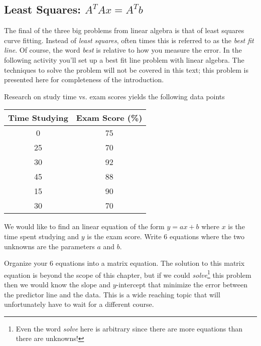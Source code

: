 \subsection*{Least Squares: $A^T A x = A^T b$}
The final of the three big problems from linear algebra is that of least squares curve
fitting.  Instead of {\it least squares}, often times this is referred to as the {\it best
fit line}.  Of course, the word {\it best} is relative to how you measure the error.  In
the following activity you'll set up a best fit line problem with linear algebra.
The techniques to solve the problem will not be covered in this text; this problem is
presented here for completeness of the introduction.

% 
\begin{problem}
Research on study time vs. exam scores yields the following data points
\begin{center}
    \begin{tabular}{|c|c|}
        \hline
        Time Studying & Exam Score (\%) \\ \hline \hline
        0 & 75 \\
        25 & 70 \\
        30 & 92 \\
        45 & 88 \\
        15 & 90 \\
        30 & 70 \\ \hline
    \end{tabular}
\end{center}

\ba
    \item We would like to find an linear equation of the form $y=ax + b$ where $x$ is the
        time spent studying and $y$ is the exam score.  Write 6 equations where the two
        unknowns are the parameters $a$ and $b$.
    \item Organize your 6 equations into a matrix equation.  The solution to this matrix
        equation is beyond the scope of this chapter, but if we could {\it
        solve}\footnote{Even the word {\it solve} here is arbitrary since there are more
    equations than there are unknowns!} this problem then we would know the slope and
    $y$-intercept that minimize the error between the predictor line and the data.  This
    is a wide reaching topic that will unfortunately have to wait for a different course.
\ea
\end{problem}



